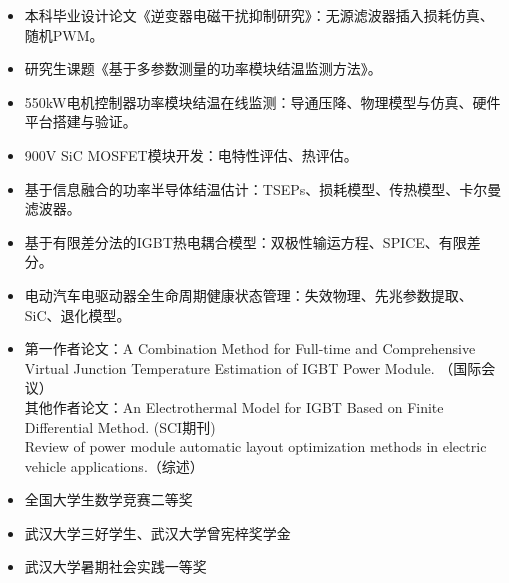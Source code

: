 \documentclass[zh]{resume}
\begin{document}
\begin{itemize}
  \item 本科毕业设计论文《逆变器电磁干扰抑制研究》：无源滤波器插入损耗仿真、随机PWM。
  \item 研究生课题《基于多参数测量的功率模块结温监测方法》。
  \item 550kW电机控制器功率模块结温在线监测：导通压降、物理模型与仿真、硬件平台搭建与验证。
  \item 900V SiC MOSFET模块开发：电特性评估、热评估。
  \item 基于信息融合的功率半导体结温估计：TSEPs、损耗模型、传热模型、卡尔曼滤波器。
  \item 基于有限差分法的IGBT热电耦合模型：双极性输运方程、SPICE、有限差分。
  \item 电动汽车电驱动器全生命周期健康状态管理：失效物理、先兆参数提取、SiC、退化模型。
  \item 第一作者论文：{\small A Combination Method for Full-time and Comprehensive Virtual Junction Temperature Estimation of IGBT Power Module. （国际会议）}\\
   其他作者论文：{\small An Electrothermal Model for IGBT Based on Finite Differential Method. (SCI期刊)\\ Review of power module automatic layout optimization methods in electric vehicle applications.（综述）}
  
\end{itemize}

\begin{itemize}
  \item 全国大学生数学竞赛二等奖
  \item 武汉大学三好学生、武汉大学曾宪梓奖学金
  \item 武汉大学暑期社会实践一等奖
\end{itemize}


\end{document}
